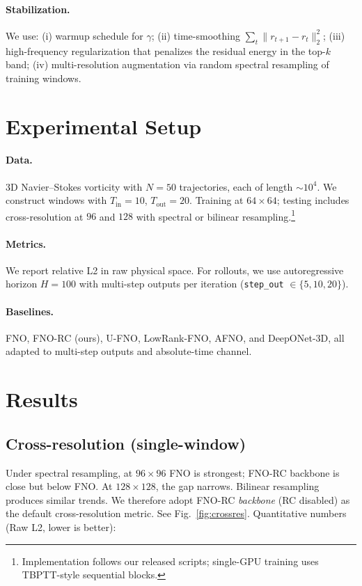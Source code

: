 \documentclass[11pt]{article}
\begin{document}
\paragraph{Stabilization.} We use: (i) warmup schedule for $\gamma$; (ii) time-smoothing $\sum_t \lVert r_{t+1}-r_t\rVert_2^2$; (iii) high-frequency regularization that penalizes the residual energy in the top-$k$ band; (iv) multi-resolution augmentation via random spectral resampling of training windows.

\section{Experimental Setup}
\paragraph{Data.} 3D Navier--Stokes vorticity with $N=50$ trajectories, each of length $\sim10^4$. We construct windows with $T_{\text{in}}=10$, $T_{\text{out}}=20$. Training at $64\times 64$; testing includes cross-resolution at $96$ and $128$ with spectral or bilinear resampling.\footnote{Implementation follows our released scripts; single-GPU training uses TBPTT-style sequential blocks.}

\paragraph{Metrics.} We report relative L2 in raw physical space. For rollouts, we use autoregressive horizon $H=100$ with multi-step outputs per iteration (\texttt{step\_out} $\in\{5,10,20\}$).

\paragraph{Baselines.} FNO, FNO-RC (ours), U-FNO, LowRank-FNO, AFNO, and DeepONet-3D, all adapted to multi-step outputs and absolute-time channel.

\section{Results}
\subsection{Cross-resolution (single-window)}
Under spectral resampling, at $96\times 96$ FNO is strongest; FNO-RC backbone is close but below FNO. At $128\times 128$, the gap narrows. Bilinear resampling produces similar trends. We therefore adopt FNO-RC \emph{backbone} (RC disabled) as the default cross-resolution metric. See Fig.~\ref{fig:crossres}. Quantitative numbers (Raw L2, lower is better):
\end{document}
